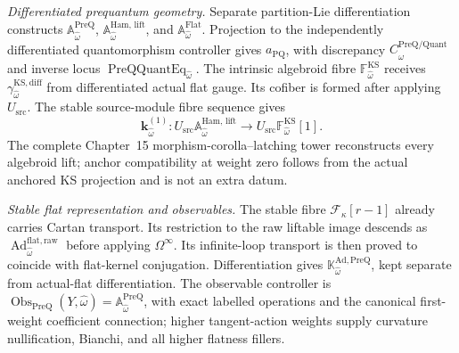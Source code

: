 \begin{theorem}
\medskip
\noindent\emph{Differentiated prequantum geometry.}
Separate partition-Lie differentiation constructs
$\mathbb A^{\mathrm{PreQ}}_{\widehat\omega}$,
$\mathbb A^{\mathrm{Ham,\,lift}}_{\widehat\omega}$, and
$\mathbb A^{\mathrm{Flat}}_{\widehat\omega}$.  Projection to the independently
differentiated quantomorphism controller gives $a_{\mathrm{PQ}}$, with discrepancy
$C^{\mathrm{PreQ/Quant}}_{\widehat\omega}$ and inverse locus
$\operatorname{PreQQuantEq}_{\widehat\omega}$.  The intrinsic algebroid fibre
$\mathbb F^{\mathrm{KS}}_{\widehat\omega}$ receives
$\gamma^{\mathrm{KS,diff}}_{\widehat\omega}$ from differentiated actual flat
gauge.  Its cofiber is formed after applying $U_{\mathrm{src}}$.  The stable
source-module fibre sequence gives
\[
\boxed{
\mathbf k_{\widehat\omega}^{(1)}:
U_{\mathrm{src}}\mathbb A_{\widehat\omega}^{\mathrm{Ham,\,lift}}
\longrightarrow
U_{\mathrm{src}}\mathbb F_{\widehat\omega}^{\mathrm{KS}}[1].
}
\]
The complete Chapter~15 morphism-corolla--latching tower reconstructs every
algebroid lift; anchor compatibility at weight zero follows from the actual
anchored KS projection and is not an extra datum.

\medskip
\noindent\emph{Stable flat representation and observables.}
The stable fibre $\mathscr F_\kappa[r-1]$ already carries Cartan transport.  Its
restriction to the raw liftable image descends as
$\operatorname{Ad}^{\mathrm{flat,raw}}_{\widehat\omega}$ before applying
$\Omega^\infty$.  Its infinite-loop transport is then proved to coincide with
flat-kernel conjugation.  Differentiation gives
$\mathbb K^{\mathrm{Ad,PreQ}}_{\widehat\omega}$, kept separate from actual-flat
differentiation.  The observable controller is
$\operatorname{Obs}_{\mathrm{PreQ}}(Y,\widehat\omega)
=\mathbb A_{\widehat\omega}^{\mathrm{PreQ}}$, with exact labelled operations and
the canonical first-weight coefficient connection; higher tangent-action weights
supply curvature nullification, Bianchi, and all higher flatness fillers.


\end{theorem}
